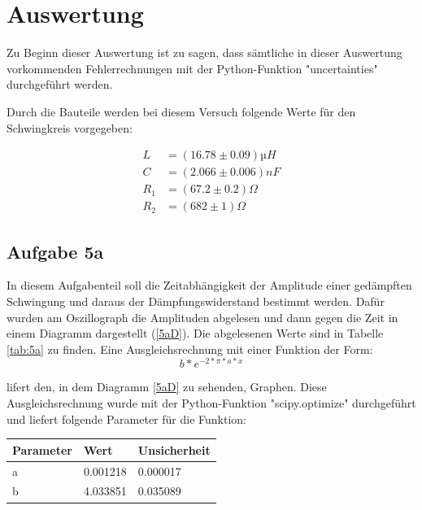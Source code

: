 \documentclass[titlepage=firstcover, captions=tableheading]{scrartcl}
\begin{document}
\section{Auswertung}

Zu Beginn dieser Auswertung ist zu sagen, dass sämtliche in dieser Auswertung vorkommenden Fehlerrechnungen mit der Python-Funktion "uncertainties" durchgeführt werden.


\noindent Durch die Bauteile werden bei diesem Versuch folgende Werte für den Schwingkreis vorgegeben:

\begin{align}
    L &= (16.78 \pm 0.09)µH  \nonumber  \\
    C &= (2.066 \pm 0.006)nF \nonumber \\
    R_1 &= (67.2 \pm 0.2) \Omega \nonumber \\
    R_2 &= (682 \pm 1) \Omega \nonumber
\end{align}

\subsection{Aufgabe 5a}

In diesem Aufgabenteil soll die Zeitabhängigkeit der Amplitude einer gedämpften Schwingung und daraus der Dämpfungswiderstand bestimmt werden.
Dafür wurden am Oszillograph die Amplituden abgelesen und dann gegen die Zeit in einem Diagramm dargestellt (\ref{5aD}).
Die abgelesenen Werte sind in Tabelle \ref{tab:5a} zu finden. 
Eine Ausgleichsrechnung mit einer Funktion der Form:
\begin{displaymath}
    b*e^{-2 * \pi * a * x}
\end{displaymath}

\noindent lifert den, in dem Diagramm \ref{5aD} zu sehenden, Graphen.
Diese Ausgleichsrechnung wurde mit der Python-Funktion "scipy.optimize" durchgeführt und liefert folgende Parameter für die Funktion:

\begin{center}
\begin{tabular}{ll @{${}\pm{}$}l}
    \toprule
    Parameter & Wert & Unsicherheit\\
    \midrule
    a & 0.001218 & 0.000017  \\
    b & 4.033851 & 0.035089  \\
\end{tabular}
\end{center}
\end{document}
